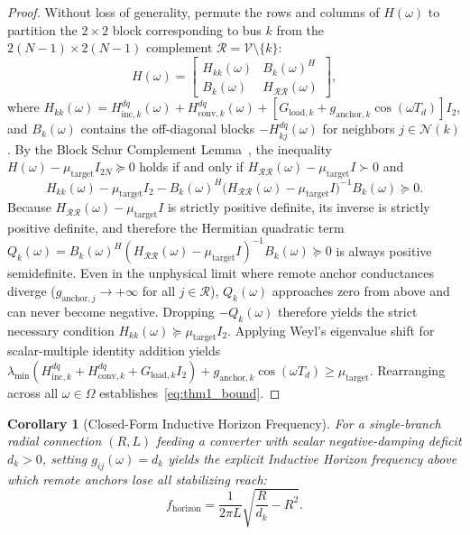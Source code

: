 \documentclass[10pt,twocolumn]{article}
\newtheorem{corollary}{Corollary}
\begin{document}
\begin{proof}
Without loss of generality, permute the rows and columns of $H(\omega)$ to partition the $2\times 2$ block corresponding to bus $k$ from the $2(N-1)\times 2(N-1)$ complement $\mathcal{R}=\mathcal{V}\setminus\{k\}$:
\begin{equation}
H(\omega) = \begin{bmatrix} H_{kk}(\omega) & B_k(\omega)^H \\ B_k(\omega) & H_{\mathcal{R}\mathcal{R}}(\omega) \end{bmatrix},
\label{eq:block_part}
\end{equation}
where $H_{kk}(\omega)=H_{\text{inc},k}^{dq}(\omega)+H_{\text{conv},k}^{dq}(\omega)+[G_{\text{load},k}+g_{\text{anchor},k}\cos(\omega T_d)]I_2$, and $B_k(\omega)$ contains the off-diagonal blocks $-H_{kj}^{dq}(\omega)$ for neighbors $j\in\mathcal{N}(k)$. By the Block Schur Complement Lemma~\cite{horn2013matrix}, the inequality $H(\omega)-\mu_{\text{target}}I_{2N}\succeq 0$ holds if and only if $H_{\mathcal{R}\mathcal{R}}(\omega)-\mu_{\text{target}}I\succ 0$ and
\begin{equation}
H_{kk}(\omega) - \mu_{\text{target}} I_2 - B_k(\omega)^H\big(H_{\mathcal{R}\mathcal{R}}(\omega)-\mu_{\text{target}}I\big)^{-1}B_k(\omega) \succeq 0.
\label{eq:schur}
\end{equation}
Because $H_{\mathcal{R}\mathcal{R}}(\omega)-\mu_{\text{target}}I$ is strictly positive definite, its inverse is strictly positive definite, and therefore the Hermitian quadratic term $Q_k(\omega)=B_k(\omega)^H(H_{\mathcal{R}\mathcal{R}}(\omega)-\mu_{\text{target}}I)^{-1}B_k(\omega)\succeq 0$ is always positive semidefinite. Even in the unphysical limit where remote anchor conductances diverge ($g_{\text{anchor},j}\to +\infty$ for all $j\in\mathcal{R}$), $Q_k(\omega)$ approaches zero from above and can never become negative. Dropping $-Q_k(\omega)$ therefore yields the strict necessary condition $H_{kk}(\omega)\succeq \mu_{\text{target}} I_2$. Applying Weyl's eigenvalue shift for scalar-multiple identity addition yields $\lambda_{\min}(H_{\text{inc},k}^{dq}+H_{\text{conv},k}^{dq}+G_{\text{load},k}I_2)+g_{\text{anchor},k}\cos(\omega T_d)\ge\mu_{\text{target}}$. Rearranging across all $\omega\in\Omega$ establishes~\eqref{eq:thm1_bound}.
\end{proof}

\begin{corollary}[Closed-Form Inductive Horizon Frequency]
For a single-branch radial connection $(R,L)$ feeding a converter with scalar negative-damping deficit $d_k>0$, setting $g_{ij}(\omega)=d_k$ yields the explicit Inductive Horizon frequency above which remote anchors lose all stabilizing reach:
\begin{equation}
f_{\text{horizon}} = \frac{1}{2\pi L}\sqrt{\frac{R}{d_k} - R^2}.
\label{eq:fhorizon}
\end{equation}
\end{corollary}
\end{document}
